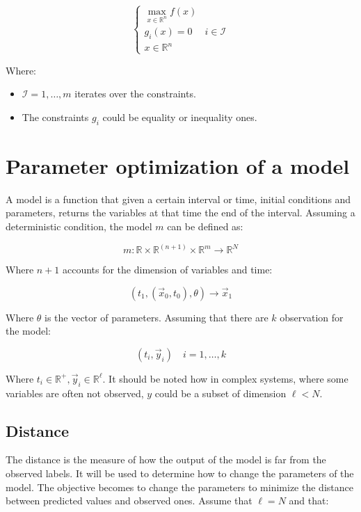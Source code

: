   $$\begin{cases} \max\limits_{x\in\mathbb{R}^n} f(x)\\g_i(x) =0 & i\in\mathcal{I}\\x\in\mathbb{R}^n\end{cases}$$

  Where:

  \begin{multicols}{2}
    \begin{itemize}
      \item $\mathcal{I} = 1, \dots, m$ iterates over the constraints.
      \item The constraints $g_i$ could be equality or inequality ones.
    \end{itemize}
  \end{multicols}

\section{Parameter optimization of a model}
A model is a function that given a certain interval or time, initial conditions and parameters, returns the variables at that time the end of the interval.
Assuming a deterministic condition, the model $m$ can be defined as:

$$m: \mathbb{R} \times \mathbb{R}^{(n+1)} \times \mathbb{R}^m \rightarrow \mathbb{R}^N$$

Where $n+1$ accounts for the dimension of variables and time:

$$\left(t_1,\left(\vec{x}_0, t_0\right), \theta\right)\rightarrow \vec{x}_1 $$

Where $\theta$ is the vector of parameters.
Assuming that there are $k$ observation for the model:

$$(t_i ,\vec{y}_i)\quad i=1, \dots, k$$

Where $t_i \in \mathbb{R}^+, \vec{y}_i \in \mathbb{R}^\ell$.
It should be noted how in complex systems, where some variables are often not observed, $y$ could be a subset of dimension $\ell <N$.

  \subsection{Distance}
  The distance is the measure of how the output of the model is far from the observed labels.
  It will be used to determine how to change the parameters of the model.
  The objective becomes to change the parameters to minimize the distance between predicted values and observed ones.
  Assume that $\ell = N$ and that:

